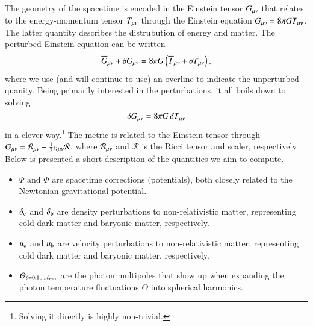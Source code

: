 



The geometry of the spacetime is encoded in the Einstein tensor $G_{\mu \nu}$ that relates to the energy-momentum tensor $T_{\mu \nu}$ through the Einstein equation $G_{\mu \nu} = 8\pi G T_{\mu \nu}$. The latter quantity describes the distrubution of energy and matter. The perturbed Einstein equation can be written
\begin{equation}
    \overline{G}_{\mu \nu} +\delta G_{\mu \nu} = 8\pi G \left( \overline{T}_{\mu \nu}+\delta T_{\mu \nu} \right),
\end{equation}
where we use (and will continue to use) an overline to indicate the unperturbed quanity. Being primarily interested in the perturbations, it all boils down to solving
\begin{equation}\label{mil3:theo:eq:delta_G}
    \delta G_{\mu \nu} = 8\pi G\, \delta T_{\mu \nu}
\end{equation}
in a clever way.\footnote{Solving it directly is highly non-trivial.} The metric is related to the Einstein tensor through $G_{\mu \nu}= \mathcal{R}_{\mu \nu} - \frac{1}{2}g_{\mu \nu} \mathcal{R}$, where $\mathcal{R}_{\mu \nu}$ and $\mathcal{R}$ is the Ricci tensor and scaler, respectively. 
Below is presented a short description of the quantities we aim to compute. 
\begin{itemize}
    \item $\Psi$ and $\Phi$ are spacetime corrections (potentials), both closely related to the Newtonian gravitational potential.
    \item $\delta_\mathrm{c}$ and $\delta_\mathrm{b}$ are density perturbations to non-relativistic matter, representing cold dark matter and baryonic matter, respectively.
    \item $u_\mathrm{c}$ and $u_\mathrm{b}$ are velocity perturbations to non-relativistic matter, representing cold dark matter and baryonic matter, respectively.
    \item $\varTheta_{\ell= 0, 1, \dots, \ell_\mathrm{max}}$ are the photon multipoles that show up when expanding the photon temperature fluctuations $\Theta$ into spherical harmonics.
\end{itemize}

